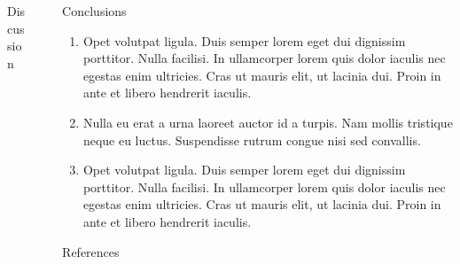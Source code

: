 \documentclass{beamer} %
\begin{document}
\begin{frame}[t]
\begin{columns}[t]
\begin{column}{0.3\textwidth}
			\begin{block}{Discussion}
			\end{block}


		\end{column}

		\begin{column}{0.03\textwidth}\end{column} %

		\begin{column}{0.3\textwidth} %


			\begin{block}{Conclusions}
				\begin{enumerate}
					\item \alert{Opet volutpat ligula.} Duis semper lorem eget dui dignissim porttitor. Nulla facilisi. In ullamcorper lorem quis dolor iaculis nec egestas enim ultricies. Cras ut mauris elit, ut lacinia dui. Proin in ante et libero hendrerit iaculis.
					\item \alert{Nulla eu erat a urna laoreet auctor id a turpis.} Nam mollis tristique neque eu luctus. Suspendisse rutrum congue nisi sed convallis.
					\item \alert{Opet volutpat ligula.} Duis semper lorem eget dui dignissim porttitor. Nulla facilisi. In ullamcorper lorem quis dolor iaculis nec egestas enim ultricies. Cras ut mauris elit, ut lacinia dui. Proin in ante et libero hendrerit iaculis.
				\end{enumerate}
			\end{block}


			\begin{block}{References}
				\small %
				\vspace{-1ex} %
			\end{block}


\end{column}
\end{columns}
\end{frame}
\end{document}
